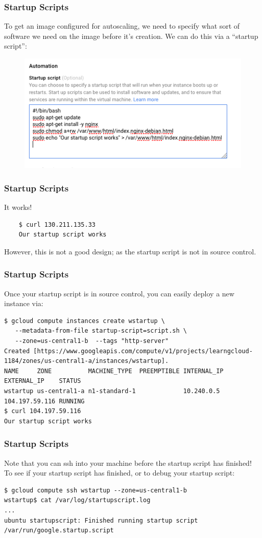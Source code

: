 \documentclass[9pt]{beamer}
\begin{document}
\begin{frame}[fragile]
  \frametitle{Startup Scripts}
  To get an image configured for autoscaling, we need to specify what sort of software we need on the image before it's creation. We can do this via a ``startup script'':
  \begin{figure}
    \includegraphics[scale=0.3]{figures/StartupScript.png}
  \end{figure}
\end{frame}

\begin{frame}[fragile]
	\frametitle{Startup Scripts}
	It works!
	\begin{verbatim}
	$ curl 130.211.135.33
	Our startup script works
	\end{verbatim}
	However, this is not a good design; as the startup script is not in source control.
\end{frame}

\begin{frame}[fragile]
\frametitle{Startup Scripts}
Once your startup script is in source control, you can easily deploy a new instance via:
\begin{verbatim}
$ gcloud compute instances create wstartup \
   --metadata-from-file startup-script=script.sh \
   --zone=us-central1-b  --tags "http-server"
Created [https://www.googleapis.com/compute/v1/projects/learngcloud-1184/zones/us-central1-a/instances/wstartup].
NAME     ZONE          MACHINE_TYPE  PREEMPTIBLE INTERNAL_IP EXTERNAL_IP    STATUS
wstartup us-central1-a n1-standard-1             10.240.0.5  104.197.59.116 RUNNING
$ curl 104.197.59.116
Our startup script works
\end{verbatim}
\end{frame}

\begin{frame}[fragile]
\frametitle{Startup Scripts}
Note that you can ssh into your machine before the startup script has finished! To see if your startup script has finished, or to debug your startup script:
\begin{verbatim}
$ gcloud compute ssh wstartup --zone=us-central1-b
wstartup$ cat /var/log/startupscript.log
...
ubuntu startupscript: Finished running startup script /var/run/google.startup.script
\end{verbatim}
\end{frame}
\end{document}
